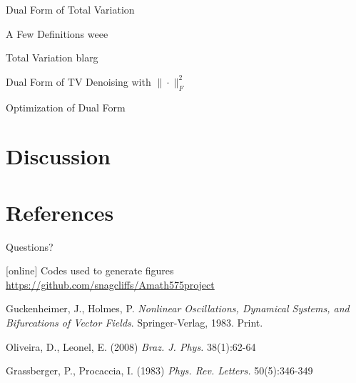 \documentclass[12pt]{beamer}
\begin{document}
\begin{frame}{Dual Form of Total Variation}

\begin{exampleblock}{A Few Definitions}
weee
\end{exampleblock}

\begin{exampleblock}{Total Variation}
blarg
\end{exampleblock}

\end{frame}

\begin{frame}{Dual Form of TV Denoising with $\|\cdot \|_F^2$}

\end{frame}

\begin{frame}{Optimization of Dual Form}

\end{frame}

\section{Discussion}

\section*{References}
\begin{frame}{Questions?}
\begin{thebibliography}{10}    
[online]
 Codes used to generate figures
\url{https://github.com/snagcliffs/Amath575project}

\beamertemplatebookbibitems %
 Guckenheimer, J., Holmes, P. \textit{Nonlinear Oscillations, Dynamical Systems, and Bifurcations of Vector Fields}. Springer-Verlag, 1983. Print.

\beamertemplatearticlebibitems %
  Oliveira, D., Leonel, E. (2008) \textit{Braz. J. Phys.} 38(1):62-64

 Grassberger, P., Procaccia, I. (1983) \textit{Phys. Rev. Letters.} 50(5):346-349

\end{thebibliography}
\end{frame}
\end{document}
